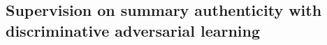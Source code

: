 



\subsection{Supervision on summary authenticity with discriminative adversarial learning}
\label{subsec:rel-sup-discriminative}

